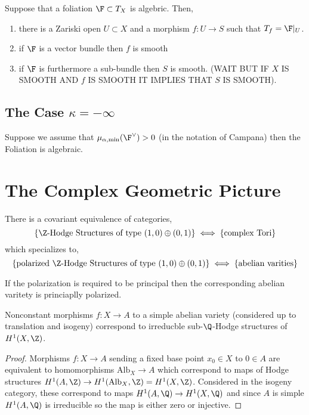 \documentclass[12pt]{article}
\begin{document}
\begin{prop}
Suppose that a foliation $\F \subset T_X$ is algebric. Then,
\begin{enumerate}
\item there is a Zariski open $U \subset X$ and a morphism $f : U \to S$ such that $T_f = \F|_U$.
\item if $\F$ is a vector bundle then $f$ is smooth
\item if $\F$ is furthermore a sub-bundle then $S$ is  smooth. (WAIT BUT IF $X$ IS SMOOTH AND $f$ IS SMOOTH IT IMPLIES THAT $S$ IS SMOOTH). 
\end{enumerate}
\end{prop}

\subsection{The Case $\kappa = -\infty$}

Suppose we assume that $\mu_{\alpha, \text{min}}(\F^\vee) > 0$ (in the notation of Campana) then the Foliation is algebraic.


\section{The Complex Geometric Picture}

\begin{prop}
There is a covariant equivalence of categories,
\[ \{ \Z\text{-Hodge Structures of type } (1,0) \oplus (0,1) \} \iff \{ \text{complex Tori} \} \]
which specializes to,
\[ \{ \text{polarized } \Z\text{-Hodge Structures of type } (1,0) \oplus (0,1) \} \iff \{ \text{abelian varities} \} \] 
\end{prop}

\begin{rmk}
If the polarization is required to be principal then the corresponding abelian varitety is princiaplly polarized. 
\end{rmk}

\begin{cor}
Nonconstant morphisms $f : X \to A$ to a simple abelian variety (considered up to translation and isogeny) correspond to irreducble sub-$\Q$-Hodge structures of $H^1(X, \Z)$.
\end{cor}

\newcommand{\Alb}{\mathrm{Alb}}

\begin{proof}
Morphisms $f : X \to A$ sending a fixed base point $x_0 \in X$ to $0 \in A$ are equivalent to homomorphisms $\mathrm{Alb}_X \to A$ which correspond to maps of Hodge structures $H^1(A, \Z) \to H^1(\Alb_X, \Z) = H^1(X, \Z)$. Considered in the isogeny category, these correspond to maps $H^1(A, \Q) \to H^1(X, \Q)$ and since $A$ is simple $H^1(A, \Q)$ is irreducible so the map is either zero or injective.
\end{proof}
\end{document}
